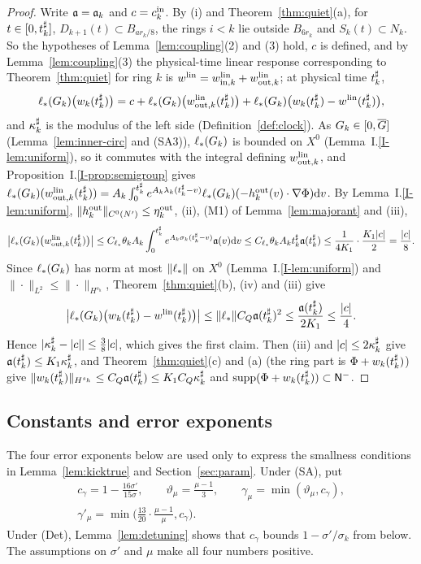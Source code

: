 \begin{proof}
Write $\mathfrak{a}=\mathfrak{a}_k$ and $c=c^{\mathrm{in}}_k$. By (i) and
Theorem~\ref{thm:quiet}(a), for $t\in[0,t^\sharp_k]$, $D_{k+1}(t)\subset B_{ar_k/8}$,
the rings $i<k$ lie outside $B_{6r_k}$ and $S_k(t)\subset N_k$. So the hypotheses
of Lemma~\ref{lem:coupling}\textup{(2)} and \textup{(3)} hold, $c$ is defined,
and by Lemma~\ref{lem:coupling}\textup{(3)} the physical-time linear response corresponding to
Theorem~\ref{thm:quiet} for ring $k$ is
$w^{\mathrm{lin}}=w^{\mathrm{lin}}_{\mathrm{in},k}+w^{\mathrm{lin}}_{\mathrm{out},k}$; at physical time $t^\sharp_k$,
\[
\ell_*(G_k)\big(w_k(t^\sharp_k)\big)=c+\ell_*(G_k)\big(w^{\mathrm{lin}}_{\mathrm{out},k}(t^\sharp_k)\big)+\ell_*(G_k)\big(w_k(t^\sharp_k)-w^{\mathrm{lin}}(t^\sharp_k)\big),
\]
and $\kappa^\sharp_k$ is the modulus of the left side (Definition~\ref{def:clock}). As
$G_k\in[0,\overline{G}]$ (Lemma~\ref{lem:inner-circ} and (SA3)), $\ell_*(G_k)$ is bounded on $X^0$ (Lemma~I.\ref{I-lem:uniform}), so
it commutes with the integral defining $w^{\mathrm{lin}}_{\mathrm{out},k}$, and
Proposition~I.\ref{I-prop:semigroup} gives
$\ell_*(G_k)(w^{\mathrm{lin}}_{\mathrm{out},k}(t^\sharp_k))=A_k\int_0^{t^\sharp_k}e^{A_k\lambda_k(t^\sharp_k-v)}\ell_*(G_k)(-h^{\mathrm{out}}_k(v)\cdot\nabla\Phi)\dd v$.
By Lemma~I.\ref{I-lem:uniform}, $\|h^{\mathrm{out}}_k\|_{C^0(N')}\le\eta^{\mathrm{out}}_k$, (ii), (M1) of
Lemma~\ref{lem:majorant} and (iii),
\[
\big|\ell_*(G_k)\big(w^{\mathrm{lin}}_{\mathrm{out},k}(t^\sharp_k)\big)\big|
\le C_{\ell_*}\theta_kA_k\int_0^{t^\sharp_k}e^{A_k\sigma_k(t^\sharp_k-v)}\mathfrak{a}(v)\dd v
\le C_{\ell_*}\theta_kA_kt^\sharp_k\mathfrak{a}(t^\sharp_k)\le\frac1{4K_1}\cdot\frac{K_1|c|}2=\frac{|c|}8 .
\]
Since $\ell_*(G_k)$ has norm at most $\|\ell_*\|$ on $X^0$
(Lemma~I.\ref{I-lem:uniform}) and $\|\cdot\|_{L^2}\le\|\cdot\|_{H^{s_h}}$,
Theorem~\ref{thm:quiet}(b), (iv) and (iii) give
\[
\big|\ell_*(G_k)\big(w_k(t^\sharp_k)-w^{\mathrm{lin}}(t^\sharp_k)\big)\big|\le\|\ell_*\|C_Q\mathfrak{a}(t^\sharp_k)^2
\le\frac{\mathfrak{a}(t^\sharp_k)}{2K_1}\le\frac{|c|}4 .
\]
Hence $|\kappa^\sharp_k-|c||\le\frac38|c|$, which gives the first claim. Then (iii) and
$|c|\le2\kappa^\sharp_k$ give $\mathfrak{a}(t^\sharp_k)\le K_1\kappa^\sharp_k$, and
Theorem~\ref{thm:quiet}(c) and (a) (the ring part is $\Phi+w_k(t^\sharp_k)$) give
$\|w_k(t^\sharp_k)\|_{H^{s_h}}\le C_Q\mathfrak{a}(t^\sharp_k)\le K_1C_Q\kappa^\sharp_k$ and
$\operatorname{supp}(\Phi+w_k(t^\sharp_k))\subset\mathsf{N}^{-}$.
\end{proof}

\subsection{Constants and error exponents}
\label{sec:relay-constants}

The four error exponents below are used only to express the smallness
conditions in Lemma~\ref{lem:kicktrue} and Section~\ref{sec:param}. Under
(SA), put
\[
\begin{gathered}
c_\gamma=1-\frac{16\sigma'}{15\sigma},\qquad
\vartheta_\mu=\frac{\mu-1}3,\qquad
\gamma_\mu=\min(\vartheta_\mu,c_\gamma),\\
\gamma'_\mu=\min\Big(\frac{13}{20}\cdot\frac{\mu-1}\mu,c_\gamma\Big).
\end{gathered}
\]
Under (Det), Lemma~\ref{lem:detuning} shows that $c_\gamma$ bounds
$1-\sigma'/\sigma_k$ from below.
The assumptions on $\sigma'$ and $\mu$ make all four numbers positive.

